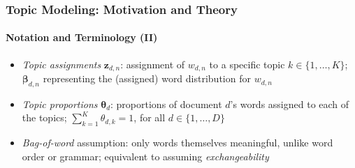 \documentclass[xcolor=dvipsnames]{beamer}
\begin{document}
\begin{frame}
\frametitle{Topic Modeling: Motivation and Theory}
\framesubtitle{Notation and Terminology (II)}
\begin{itemize}
\item \textit{Topic assignments} $\boldsymbol{z}_{d,n}$: assignment of $w_{d,n}$ to a specific topic $k \in \{1,\dots,K\}$; $\boldsymbol{\beta}_{d,n}$ representing the (assigned) word distribution for $w_{d,n}$
\item \textit{Topic proportions} $\boldsymbol{\theta}_d$: proportions of document $d$'s words assigned to each of the topics; $\sum_{k=1}^{K}\theta_{d,k}=1$, for all $d \in \{1,\dots,D\}$
\item \textit{Bag-of-word} assumption: only words themselves meaningful, unlike word order or grammar; equivalent to assuming \textit{exchangeability}
\end{itemize}
\end{frame}
\end{document}
